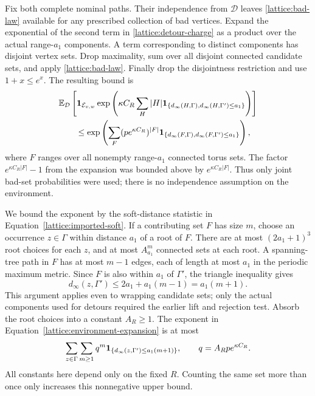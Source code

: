 Fix both complete nominal paths.  Their independence from $\mathcal D$
leaves \eqref{lattice:bad-law} available for any prescribed collection of
bad vertices.  Expand the exponential of the second term in
\eqref{lattice:detour-charge} as a product over the actual range-$a_1$
components.  A term corresponding to distinct components has disjoint
vertex sets.  Drop maximality, sum over all disjoint connected candidate
sets, and apply \eqref{lattice:bad-law}.  Finally drop the disjointness
restriction and use $1+x\le e^x$.  The resulting bound is
\begin{align}\label{lattice:environment-expansion}
 &\mathbb E_{\mathcal D}\left[
 \mathbf 1_{\mathcal E_{v,w}}
 \exp\left(\kappa C_R\sum_H|H|
   \mathbf 1_{\{d_\infty(H,\Gamma),d_\infty(H,\Gamma')\le a_1\}}\right)
                       \right]\notag\\
 &\qquad\le
 \exp\left(\sum_F
       (p e^{\kappa C_R})^{|F|}
       \mathbf 1_{\{d_\infty(F,\Gamma),d_\infty(F,\Gamma')\le a_1\}}
                         \right),
\end{align}
where $F$ ranges over all nonempty range-$a_1$ connected torus sets.
The factor $e^{\kappa C_R|F|}-1$ from the expansion was bounded above
by $e^{\kappa C_R|F|}$.  Thus only joint bad-set probabilities were
used; there is no independence assumption on the environment.

We bound the exponent by the soft-distance statistic in
Equation~\eqref{lattice:imported-soft}. If a contributing set $F$ has size $m$,
choose an occurrence $z\in\Gamma$ within distance $a_1$ of a root of $F$.
There are at most $(2a_1+1)^3$ root choices for each $z$, and at most
$A_{a_1}^m$ connected sets at each root. A spanning-tree path in $F$ has
at most $m-1$ edges, each of length at most $a_1$ in the periodic maximum
metric. Since $F$ is also within $a_1$ of $\Gamma'$, the triangle inequality
gives
\[
 d_\infty(z,\Gamma')\le 2a_1+a_1(m-1)=a_1(m+1).
\]
This argument applies even to wrapping candidate sets; only the actual
components used for detours required the earlier lift and rejection test.
Absorb the root choices into a constant $A_R\ge1$. The exponent in
Equation~\eqref{lattice:environment-expansion} is at most
\begin{equation}\label{lattice:animal-series}
 \sum_{z\in\Gamma}\sum_{m\ge1}q^m
       \mathbf 1_{\{d_\infty(z,\Gamma')\le a_1(m+1)\}},
 \qquad q=A_Rp e^{\kappa C_R}.
\end{equation}
All constants here depend only on the fixed $R$. Counting the same set
more than once only increases this nonnegative upper bound.

